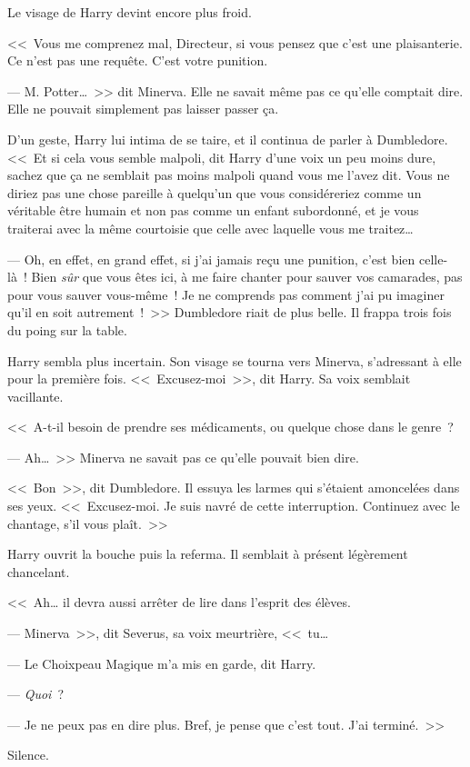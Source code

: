 Le visage de Harry devint encore plus froid.

<<~Vous me comprenez mal, Directeur, si vous pensez que c'est une plaisanterie. Ce n'est pas une requête. C'est votre punition.

--- M. Potter…~>> dit Minerva. Elle ne savait même pas ce qu'elle comptait dire. Elle ne pouvait simplement pas laisser passer ça.

D'un geste, Harry lui intima de se taire, et il continua de parler à Dumbledore. <<~Et si cela vous semble malpoli, dit Harry d’une voix un peu moins dure, sachez que ça ne semblait pas moins malpoli quand vous me l'avez dit. Vous ne diriez pas une chose pareille à quelqu'un que vous considéreriez comme un véritable être humain et non pas comme un enfant subordonné, et je vous traiterai avec la même courtoisie que celle avec laquelle vous me traitez…

--- Oh, en effet, en grand effet, si j'ai jamais reçu une punition, c'est bien celle-là~! Bien \emph{sûr} que vous êtes ici, à me faire chanter pour sauver vos camarades, pas pour vous sauver vous-même~! Je ne comprends pas comment j'ai pu imaginer qu'il en soit autrement~!~>> Dumbledore riait de plus belle. Il frappa trois fois du poing sur la table.

Harry sembla plus incertain. Son visage se tourna vers Minerva, s'adressant à elle pour la première fois. <<~Excusez-moi~>>, dit Harry. Sa voix semblait vacillante.

<<~A-t-il besoin de prendre ses médicaments, ou quelque chose dans le genre~?

--- Ah…~>> Minerva ne savait pas ce qu'elle pouvait bien dire.

<<~Bon~>>, dit Dumbledore. Il essuya les larmes qui s'étaient amoncelées dans ses yeux. <<~Excusez-moi. Je suis navré de cette interruption. Continuez avec le chantage, s'il vous plaît.~>>

Harry ouvrit la bouche puis la referma. Il semblait à présent légèrement chancelant.

<<~Ah… il devra aussi arrêter de lire dans l'esprit des élèves.

--- Minerva~>>, dit Severus, sa voix meurtrière, <<~tu…

--- Le Choixpeau Magique m'a mis en garde, dit Harry.

--- \emph{Quoi}~?

--- Je ne peux pas en dire plus. Bref, je pense que c'est tout. J'ai terminé.~>>

Silence.

